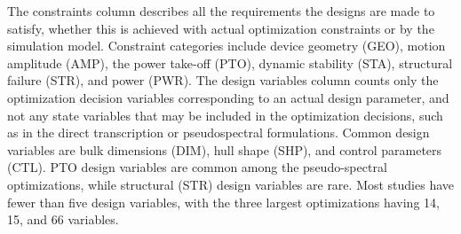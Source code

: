 The constraints column describes all the requirements the designs are made to satisfy, whether this is achieved with actual optimization constraints or by the simulation model.
Constraint categories include device geometry (GEO), motion amplitude (AMP), the power take-off (PTO), dynamic stability (STA), structural failure (STR), and power (PWR).
The design variables column counts only the optimization decision variables corresponding to an actual design parameter, and not any state variables that may be included in the optimization decisions, such as in the direct transcription or pseudospectral formulations.
Common design variables are bulk dimensions (DIM), hull shape (SHP), and control parameters (CTL).
PTO design variables are common among the pseudo-spectral optimizations, while structural (STR) design variables are rare.
Most studies have fewer than five design variables, with the three largest optimizations having 14, 15, and 66 variables.


